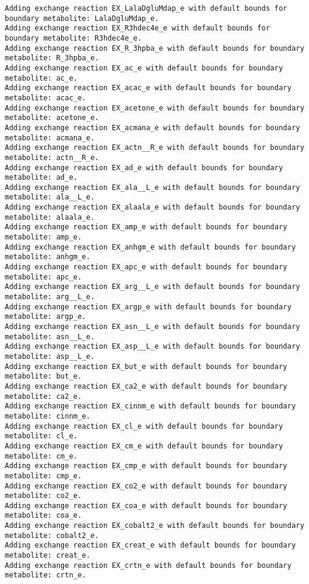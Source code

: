 \documentclass[
  letterpaper,
  DIV=11,
  numbers=noendperiod]{scrartcl}
\begin{document}
\begin{verbatim}
Adding exchange reaction EX_LalaDgluMdap_e with default bounds for boundary metabolite: LalaDgluMdap_e.
Adding exchange reaction EX_R3hdec4e_e with default bounds for boundary metabolite: R3hdec4e_e.
Adding exchange reaction EX_R_3hpba_e with default bounds for boundary metabolite: R_3hpba_e.
Adding exchange reaction EX_ac_e with default bounds for boundary metabolite: ac_e.
Adding exchange reaction EX_acac_e with default bounds for boundary metabolite: acac_e.
Adding exchange reaction EX_acetone_e with default bounds for boundary metabolite: acetone_e.
Adding exchange reaction EX_acmana_e with default bounds for boundary metabolite: acmana_e.
Adding exchange reaction EX_actn__R_e with default bounds for boundary metabolite: actn__R_e.
Adding exchange reaction EX_ad_e with default bounds for boundary metabolite: ad_e.
Adding exchange reaction EX_ala__L_e with default bounds for boundary metabolite: ala__L_e.
Adding exchange reaction EX_alaala_e with default bounds for boundary metabolite: alaala_e.
Adding exchange reaction EX_amp_e with default bounds for boundary metabolite: amp_e.
Adding exchange reaction EX_anhgm_e with default bounds for boundary metabolite: anhgm_e.
Adding exchange reaction EX_apc_e with default bounds for boundary metabolite: apc_e.
Adding exchange reaction EX_arg__L_e with default bounds for boundary metabolite: arg__L_e.
Adding exchange reaction EX_argp_e with default bounds for boundary metabolite: argp_e.
Adding exchange reaction EX_asn__L_e with default bounds for boundary metabolite: asn__L_e.
Adding exchange reaction EX_asp__L_e with default bounds for boundary metabolite: asp__L_e.
Adding exchange reaction EX_but_e with default bounds for boundary metabolite: but_e.
Adding exchange reaction EX_ca2_e with default bounds for boundary metabolite: ca2_e.
Adding exchange reaction EX_cinnm_e with default bounds for boundary metabolite: cinnm_e.
Adding exchange reaction EX_cl_e with default bounds for boundary metabolite: cl_e.
Adding exchange reaction EX_cm_e with default bounds for boundary metabolite: cm_e.
Adding exchange reaction EX_cmp_e with default bounds for boundary metabolite: cmp_e.
Adding exchange reaction EX_co2_e with default bounds for boundary metabolite: co2_e.
Adding exchange reaction EX_coa_e with default bounds for boundary metabolite: coa_e.
Adding exchange reaction EX_cobalt2_e with default bounds for boundary metabolite: cobalt2_e.
Adding exchange reaction EX_creat_e with default bounds for boundary metabolite: creat_e.
Adding exchange reaction EX_crtn_e with default bounds for boundary metabolite: crtn_e.

\end{verbatim}
\end{document}
